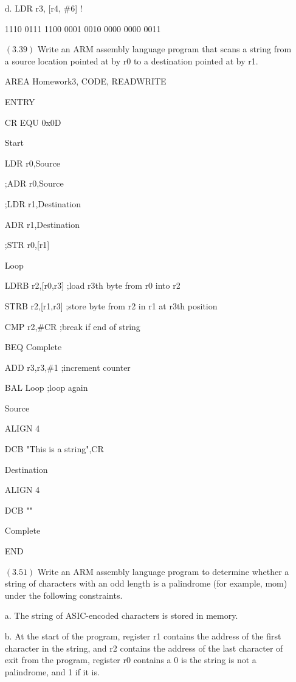 \documentclass[letterpaper,10pt,titlepage]{article}
\begin{document}
\begin{enumerate}
d. LDR r3, [r4, \#6] !

1110 0111 1100 0001 0010 0000 0000 0011


\item[$(3.39)$]Write an ARM assembly language program that scans a string from a source location pointed at by r0 to a destination pointed at by r1.

	AREA Homework3, CODE, READWRITE

	ENTRY
	
CR		EQU		0x0D	
	
Start

		LDR		r0,Source

		;ADR		r0,Source

		;LDR		r1,Destination

		ADR		r1,Destination

		;STR		r0,[r1]

	
Loop

		LDRB	r2,[r0,r3]		;load r3th byte from r0 into r2

		STRB	r2,[r1,r3]		;store byte from r2 in r1 at r3th position

		CMP 	r2,\#CR			;break if end of string

		BEQ		Complete		

		ADD		r3,r3,\#1		;increment counter

		BAL 	Loop			;loop again


Source

		ALIGN 4

		DCB 	"This is a string",CR

		

Destination

		ALIGN 4

		DCB		""



Complete		

		

	END



\item[$(3.51)$]Write an ARM assembly language program to determine whether a string of characters with an odd length is a palindrome (for example, mom) under the following constraints.

a. The string of ASIC-encoded characters is stored in memory.

b. At the start of the program, register r1 contains the address of the first character in the string, and r2 contains the address of the last character of exit from the program, register r0 contains a 0 is the string is not a palindrome, and 1 if it is.



\end{enumerate}
\end{document}
